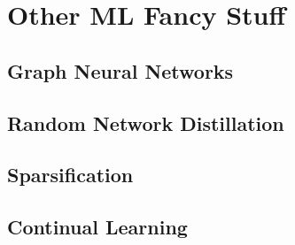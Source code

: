
\chapter{Other ML Fancy Stuff}
\label{chap:advanced-ml}
\minitoc
\section{Graph Neural Networks}
\section{Random Network Distillation}
\section{Sparsification}
\section{Continual Learning}

